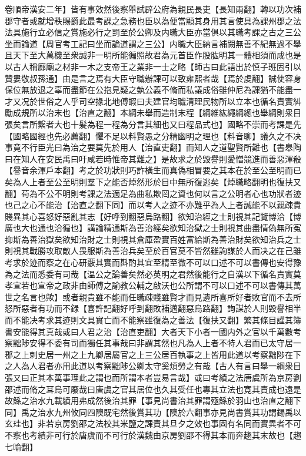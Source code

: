 卷順帝漢安二年】皆有事效然後察舉試辟公府為親民長吏【長知兩翻】轉以功次補郡守者或就增秩賜爵此最考課之急務也臣以為便當顯其身用其言使具為課州郡之法法具施行立必信之賞施必行之罰至於公卿及内職大臣亦當俱以其職考課之古之三公坐而論道【周官考工記曰坐而論道謂之三公】内職大臣納言補闕無善不紀無過不舉且天下至大萬機至衆誠非一明所能徧照故君為元首臣作股肱明其一體相須而成也是以古人稱廊廟之材非一木之支帝王之業非一士之略【師古曰此語出於慎子班固引以贊婁敬叔孫通】由是言之焉有大臣守職辦課可以致雍熙者哉【焉於䖍翻】誠使容身保位無放退之辜而盡節在公抱見疑之埶公義不脩而私議成俗雖仲尼為課猶不能盡一才又况於世俗之人乎司空掾北地傅嘏曰夫建官均職清理民物所以立本也循名責實糾勵成規所以治末也【治直之翻】本綱未舉而造制末程【綱維紘繩綱總也舉綱則衆目張矣言所繫者大也十髪為程一程為分言其細也又曰程品式也】國略不崇而考課是先【國略國經也先必薦翻】懼不足以料賢愚之分精幽明之理也【料音聊】議久之不决事竟不行臣光曰為治之要莫先於用人【治直吏翻】而知人之道聖賢所難也【書皋陶曰在知人在安民禹曰吁咸若時惟帝其難之】是故求之於毁譽則愛憎競進而善惡渾殽【譽音余渾戶本翻】考之於功狀則巧詐橫生而真偽相冒要之其本在於至公至明而已矣為人上者至公至明則羣下之能否焯然形於目中無所復逃矣【焯職略翻明也復扶又翻】苟為不公不明則考課之法適足為曲私欺罔之資也何以言之公明者心也功狀者迹也己之心不能治【治直之翻下同】而以考人之迹不亦難乎為人上者誠能不以親疎貴賤異其心喜怒好惡亂其志【好呼到翻惡烏路翻】欲知治經之士則視其記覽博洽【博廣也大也通也洽徧也】講論精通斯為善治經矣欲知治獄之士則視其曲盡情偽無所寃抑斯為善治獄矣欲知治財之士則視其倉庫盈實百姓富給斯為善治財矣欲知治兵之士則視其戰勝攻取敵人畏服斯為善治兵矣至於百官莫不皆然雖詢謀於人而决之在己雖考求於迹而察之在心研覈其實而斟酌其宜至精至微不可以口述不可以書傳也安得豫為之法而悉委有司哉【温公之論善矣然必英明之君然後能行之自漢以下循名責實莫孝宣若也宣帝之政非由師傅之諭教公輔之啟沃也公所謂不可以口述不可以書傳其萬世之名言也歟】或者親貴雖不能而任職疎賤雖賢才而見遺所喜所好者敗官而不去所怒所惡者有功而不録【喜許記翻好呼到翻敗補邁翻惡烏路翻】詢謀於人則毁譽相半而不能决考求其迹則文具實亡而不能察雖復為之善法【復扶又翻】繁其條目謹其簿書安能得其真哉或曰人君之治【治直吏翻】大者天下小者一國内外之官以千萬數考察黜陟安得不委有司而獨任其事哉曰非謂其然也凡為人上者不特人君而已太守居一郡之上刺史居一州之上九卿居屬官之上三公居百執事之上皆用此道以考察黜陟在下之人為人君者亦用此道以考察黜陟公卿太守奚煩勞之有哉【古人有言曰舉一綱衆目張又曰正其本萬事理此之謂也而所謂本者豈易言哉】或曰考績之法唐虞所為京房劉邵述而脩之耳烏可廢哉曰唐虞之官其居位也久其受任也專其立法也寛其責成也遠是故鯀之治水九載績用弗成然後治其罪【事見尚書治其罪謂殛鯀於羽山也治直之翻下同】禹之治水九州攸同四隩既宅然後賞其功【隩於六翻事亦見尚書賞其功謂錫禹以玄珪也】非若京房劉邵之法校其米鹽之課責其旦夕之效也事固有名同而實異者不可不察也考績非可行於唐虞而不可行於漢魏由京房劉邵不得其本而奔趨其末故也【趨七喻翻】

